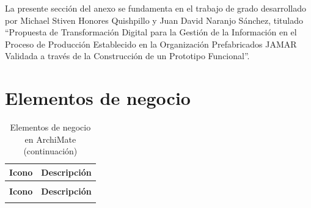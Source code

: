 \noindent
\noindent
La presente sección del anexo se fundamenta en el trabajo de grado desarrollado por Michael Stiven Honores Quishpillo y Juan David Naranjo Sánchez, titulado ``Propuesta de Transformación Digital para la Gestión de la Información en el Proceso de Producción Establecido en la Organización Prefabricados JAMAR Validada a través de la Construcción de un Prototipo Funcional''.

\section{Elementos de negocio}

\begin{longtable}{|c|p{8cm}|}
	\caption{Elementos de negocio en ArchiMate} \label{tab:elementos-negocio-archimate}                                                  \\
	\hline
	\textbf{Icono}                                             & \textbf{Descripción}                                                    \\
	\hline
	\endfirsthead

	\caption[]{Elementos de negocio en ArchiMate (continuación)}                                                                         \\
	\hline
	\textbf{Icono}                                             & \textbf{Descripción}                                                    \\
	\hline
	\endhead

	\hline
	\endfoot


\end{longtable}
